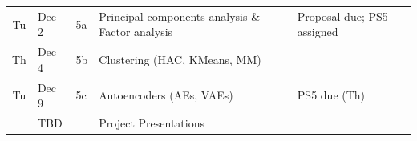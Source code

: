 \documentclass[11pt,twoside]{article}
\numberwithin{equation}{section}
\newcommand{\?}{\stackrel{?}{=}}
\begin{document}
\begin{table}[h!]
\begin{tabular}{cllll}
Tu       & Dec 2     & 5a      & Principal components analysis \& Factor analysis                   &  Proposal due; PS5 assigned                              \\ 
Th       & Dec 4     & 5b      &  Clustering (HAC, KMeans, MM)                                  &                                \\
Tu       & Dec 9     & 5c      &  Autoencoders (AEs, VAEs)                             &     PS5 due (Th)                    \\ \midrule
       & TBD    &         &  Project Presentations                         &                         \\ 
\bottomrule
\end{tabular}

\end{table}
 
\end{document}
